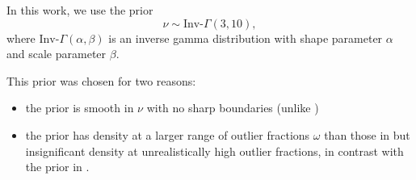 \documentclass[fleqn,usenatbib]{mnras}
\begin{document}
In this work, we use the prior
\begin{equation}
    \nu \sim \text{Inv-}\Gamma(3, 10),
\end{equation}
where $\text{Inv-}\Gamma(\alpha, \beta)$ is an inverse gamma distribution with
{\color{red} shape parameter $\alpha$ and scale parameter $\beta$}.

This prior was chosen for two reasons:
\begin{itemize}
    \item the prior is smooth in $\nu$ with no sharp boundaries (unlike
          \citet{Gelman:2013})
    \item the prior has density at a larger range of outlier fractions $\omega$
          than those in \citet{Juarez:2010, Ding:2014} but insignificant density
          at unrealistically high outlier fractions, in contrast with the prior
          in \citet{Feeney:2018}.
\end{itemize}



\bsp	%
\label{lastpage}
\end{document}

